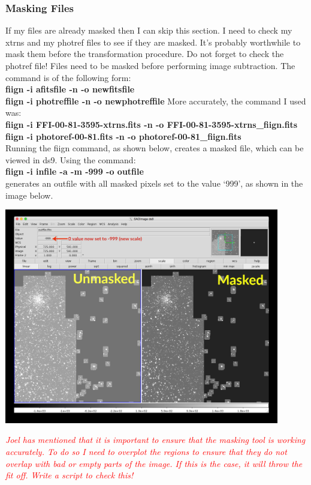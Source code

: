 \documentclass[11pt,letterpaper]{book} %
\begin{document}
\subsubsection*{Masking Files}
If my files are already masked then I can skip this section. 
I need to check my xtrns and my photref files to see if they are masked. 
It's probably worthwhile to mask them before the transformation procedure.
Do not forget to check the photref file!
Files need to be masked before performing image subtraction. 
The command is of the following form:\\ 
\textbf{fiign -i afitsfile -n -o newfitsfile \\
fiign -i photreffile -n -o newphotreffile}
More accurately, the command I used was: \\
\textbf{fiign -i FFI-00-81-3595-xtrns.fits -n -o FFI-00-81-3595-xtrns\_fiign.fits}\\
\textbf{fiign -i photoref-00-81.fits -n -o photoref-00-81\_fiign.fits}\\
Running the fiign command, as shown below, creates a masked file, which can be viewed in ds9. Using the command: \\
\textbf{fiign -i infile -a -m -999 -o outfile}\\
generates an outfile with all masked pixels set to the value `999', as shown in the image below. 
\begin{center}
\includegraphics[width=0.9\textwidth]{masked.jpg}
\end{center}

\textcolor{red}{\textit{Joel has mentioned that it is important to ensure that the masking tool is working accurately. To do so I need to overplot the regions to ensure that they do not overlap with bad or empty parts of the image. If this is the case, it will throw the fit off. Write a script to check this!}}
\end{document}
